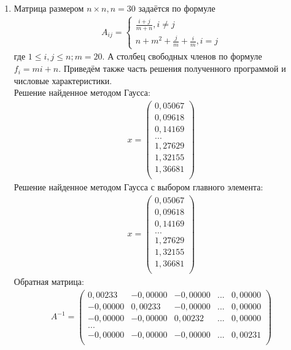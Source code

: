 \documentclass[a4paper,12pt,titlepage,finall]{article}
\begin{document}
\begin{enumerate}
\item
Матрица размером $n \times n, n = 30$ задаётся по формуле
\begin{align}
A_{ij} = \left\{
\begin{array}{ll}
\frac{i+j}{m+n}, i \neq j\\
n + m^2 + \frac{j}{m} + \frac{i}{m}, i = j
\end{array}
\right.
\end{align}
где $1 \leq i,j \leq n; m = 20$. А столбец свободных членов по формуле $f_i = mi + n$. Приведём также часть решения полученного программой и числовые характеристики.\\
Решение найденное методом Гаусса:
\begin{align*}
x = \begin{pmatrix}
0,05067 \\
   0,09618 \\
   0,14169 \\
   ...\\
   1,27629 \\
   1,32155 \\
   1,36681 \\
\end{pmatrix}
\end{align*}
Решение найденное методом Гаусса с выбором главного элемента:
\begin{align*}
x = \begin{pmatrix}
  0,05067 \\
   0,09618 \\
   0,14169 \\
   ...\\
   1,27629 \\
   1,32155 \\
   1,36681 \\
\end{pmatrix}
\end{align*}
Обратная матрица:
\begin{align*}
A^{-1} = \begin{pmatrix}
    0,00233&    -0,00000&    -0,00000& ... &0,00000\\
   -0,00000&     0,00233&    -0,00000& ... &0,00000\\
   -0,00000&    -0,00000&     0,00232& ... &0,00000\\
   ...\\
   -0,00000&    -0,00000&    -0,00000& ... &0,00231\\
\end{pmatrix}
\end{align*}

\end{enumerate}
\end{document}
